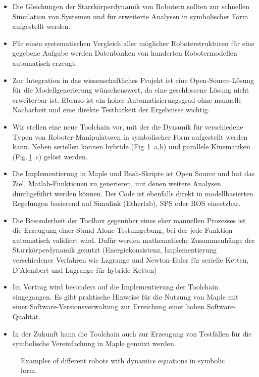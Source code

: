 \documentclass[runningheads]{llncs}
\begin{document}
\begin{itemize}
\item Die Gleichungen der Starrkörperdynamik von Robotern sollten zur schnellen Simulation von Systemen und für erweiterte Analysen in symbolischer Form aufgestellt werden.
\item Für einen systematischen Vergleich aller möglicher Roboterstrukturen für eine gegebene Aufgabe werden Datenbanken von hunderten Robotermodellen automatisch erzeugt.
\item Zur Integration in das wissenschaftliches Projekt ist eine Open-Source-Lösung für die Modellgenerierung wünschenswert, da eine geschlossene Lösung nicht erweiterbar ist. Ebenso ist ein hoher Automatisierungsgrad ohne manuelle Nacharbeit und eine direkte Testbarkeit der Ergebnisse wichtig.
\item Wir stellen eine neue Toolchain vor, mit der die Dynamik für verschiedene Typen von Roboter-Manipulatoren in symbolischer Form aufgestellt werden kann. Neben seriellen können hybride (Fig.\,\ref{fig:robot_examples}~a,b) und parallele Kinematiken (Fig.\,\ref{fig:robot_examples}~c) gelöst werden.
\item Die Implementierung in Maple und Bash-Skripte ist Open Source und hat das Ziel, Matlab-Funktionen zu generieren, mit denen weitere Analysen durchgeführt werden können. Der Code ist ebenfalls direkt in modellbasierten Regelungen basierend auf Simulink (Etherlab), SPS oder ROS einsetzbar.
\item Die Besonderheit der Toolbox gegenüber eines eher manuellen Prozesses ist die Erzeugung einer Stand-Alone-Testumgebung, bei der jede Funktion automatisch validiert wird. Dafür werden mathematische Zusammenhänge der Starrkörperdynamik genutzt (Energiekonsistenz, Implementierung verschiedener Verfahren wie Lagrange und Newton-Euler für serielle Ketten, D'Alembert und Lagrange für hybride Ketten)
\item Im Vortrag wird besonders auf die Implementierung der Toolchain eingegangen. Es gibt praktische Hinweise für die Nutzung von Maple mit einer Software-Versionsverwaltung zur Erreichung einer hohen Software-Qualität.
\item In der Zukunft kann die Toolchain auch zur Erzeugung von Testfällen für die symbolische Vereinfachung in Maple genutzt werden.
\end{itemize}

\begin{figure}[htb]
	
	\caption{Examples of different robots with dynamics equations in symbolic form.}
	\label{fig:robot_examples}
\end{figure} 

%
%
%
%
%
\end{document}
